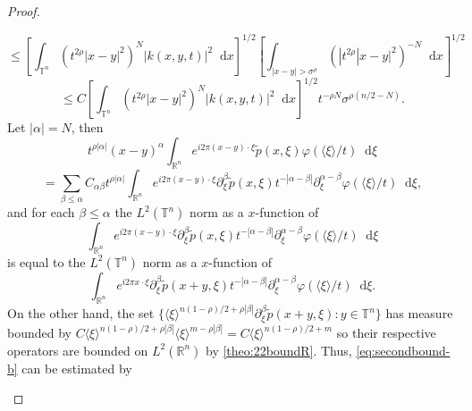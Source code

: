 \documentclass[10pt,a4paper]{amsart}
\newcommand*\diff{\mathop{}\!\mathrm{d}}
\begin{document}
\begin{proof}
\begin{itemize}
\begin{equation*}
        \end{equation*}
        \begin{equation*}
            \leq \left[ \int_{\mathbb{T}^n} \left( t^{2\rho} |x-y|^2 \right)^N |k(x, y, t)|^2 \diff x \right]^{1/2} \left[ \int_{|x-y|>\sigma^\rho} \left(|t^{2\rho}|x-y|^2\right)^{-N}\diff x \right]^{1/2}
        \end{equation*}
        \begin{equation}
            \leq C \left[ \int_{\mathbb{T}^n} \left( t^{2\rho}|x-y|^2 \right)^N|k(x,y,t)|^2 \diff x \right]^{1/2}t^{-\rho N}\sigma^{\rho(n/2 - N)}.
            \label{eq:secondbound-b}
        \end{equation} 
        Let $|\alpha|=N$, then 
        \begin{equation*}
            t^{\rho|\alpha|} (x-y)^\alpha \int_{\mathbb{R}^n} e^{i2\pi(x - y) \cdot \xi} \tilde{p}(x, \xi)\varphi(\langle\xi\rangle/t)\diff\xi 
        \end{equation*}
        \begin{equation*}
            = \sum_{\beta\leq\alpha} C_{\alpha\beta}t^{\rho|\alpha|} \int_{\mathbb{R}^n} e^{i2\pi(x - y) \cdot \xi} \partial^\beta_\xi \tilde{p}(x, \xi)t^{-|\alpha-\beta|} \partial^{\alpha-\beta}_\xi \varphi(\langle\xi\rangle/t)\diff \xi,
        \end{equation*}
        and for each $\beta\leq\alpha$ the $L^2(\mathbb{T}^n)$ norm as a $x$-function of 
        \begin{equation*}
            \int_{\mathbb{R}^n} e^{i2\pi(x - y) \cdot \xi} \partial^\beta_\xi \tilde{p}(x, \xi)t^{-|\alpha-\beta|} \partial^{\alpha-\beta}_\xi \varphi(\langle\xi\rangle/t)\diff \xi
        \end{equation*}
        is equal to the $L^2(\mathbb{T}^n)$ norm as a $x$-function of 
        \begin{equation*}
            \int_{\mathbb{R}^n} e^{i2\pi x \cdot \xi} \partial^\beta_\xi \tilde{p}(x+y, \xi)t^{-|\alpha-\beta|} \partial^{\alpha-\beta}_\xi \varphi(\langle\xi\rangle/t)\diff \xi.
        \end{equation*}
        On the other hand, the set $\{ \langle\xi\rangle^{n(1-\rho)/2 + \rho|\beta|} \partial^\beta_\xi\tilde{p}(x + y, \xi) : y \in \mathbb{T}^n  \}$ has measure bounded by $C\langle\xi\rangle^{n(1-\rho)/2 + \rho|\beta|} \langle\xi\rangle^{m- \rho|\beta|} = C\langle\xi\rangle^{n(1-\rho)/2 +m}   $ so their respective operators are bounded on $L^2(\mathbb{R}^n)$ by \cref{theo:22boundR}. Thus, \cref{eq:secondbound-b} can be estimated by  


\end{itemize}
\end{proof}
\end{document}
